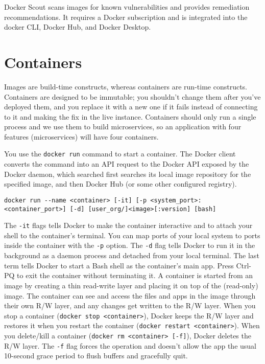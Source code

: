 \documentclass[8pt, table, xcdraw]{article}%
\begin{document}
Docker Scout scans images for known vulnerabilities and provides remediation recommendations. It requires a Docker subscription and is integrated into the docker CLI, Docker Hub, and Docker Desktop.

\section{Containers}

Images are build-time constructs, whereas containers are run-time constructs. Containers are designed to be immutable; you shouldn’t change them after you’ve deployed them, and you replace it with a new one if it fails instead of connecting to it and making the fix in the live instance. Containers should only run a single process and we use them to build microservices, so an application with four features (microservices) will have four containers.

You use the \lstinline{docker run} command to start a container. The Docker client converts the command into an API request to the Docker API exposed by the Docker daemon, which searched first searches its local image repository for the specified image, and then Docker Hub (or some other configured registry).

\begin{lstlisting}
docker run --name <container> [-it] [-p <system_port>:<container_port>] [-d] [user_org/]<image>[:version] [bash]
\end{lstlisting}

The \lstinline{-it} flags tells Docker to make the container interactive and to attach your shell to the container’s terminal. You can map ports of your local system to ports inside the container with the \lstinline{-p} option. The \lstinline{-d} flag tells Docker to run it in the background as a daemon process and detached from your local terminal. The last term tells Docker to start a Bash shell as the container’s main app. Press Ctrl-PQ to exit the container without terminating it.
A container is started from an image by creating a thin read-write layer and placing it on top of the (read-only) image. The container can see and access the files and apps in the image through their own R/W layer, and any changes get written to the R/W layer. When you stop a container (\lstinline{docker stop <container>}), Docker keeps the R/W layer and restores it when you restart the container (\lstinline{docker restart <container>}). When you delete/kill a container (\lstinline{docker rm <container> [-f]}), Docker deletes the R/W layer. The \lstinline{-f} flag forces the operation and doesn’t allow the app the usual 10-second grace period to flush buffers and gracefully quit.
\end{document}
